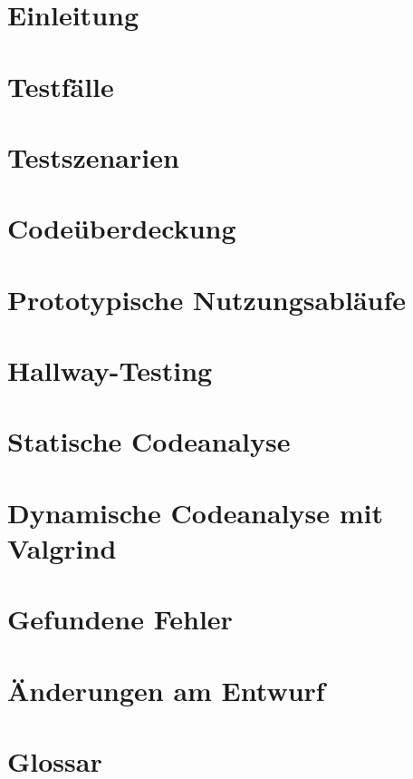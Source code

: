 

	
	\maketitle
	\setcounter{tocdepth}{1}
	\tableofcontents
	\chapter{Einleitung}
		
	\chapter{Testfälle}
		
	\chapter{Testszenarien}
		
	\chapter{Codeüberdeckung}
		
	\chapter{Prototypische Nutzungsabläufe}
		
	\chapter{Hallway-Testing}
		
	\chapter{Statische Codeanalyse}
		
	\chapter{Dynamische Codeanalyse mit Valgrind}
		
	\chapter{Gefundene Fehler}
		
	\chapter{Änderungen am Entwurf}
		
	\chapter{Glossar}
		
